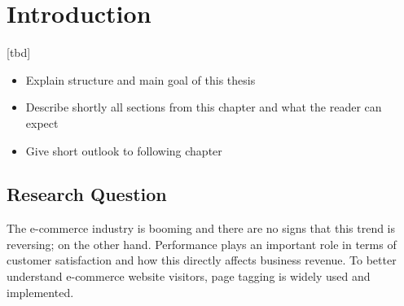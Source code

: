 \chapter{Introduction}

[tbd]

\begin{itemize}
	\item Explain structure and main goal of this thesis
	\item Describe shortly all sections from this chapter and what the reader can expect
	\item Give short outlook to following chapter
\end{itemize}












\section{Research Question}
\label{chapter:research_question}

The e-commerce industry is booming and there are no signs that this trend is reversing; on the other hand.
Performance plays an important role in terms of customer satisfaction and how this directly affects business revenue.
To better understand e-commerce website visitors, page tagging is widely used and implemented.

